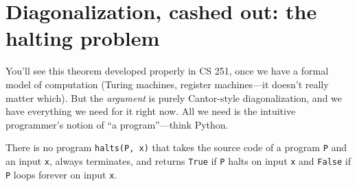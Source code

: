 \documentclass[11pt]{article}
\begin{document}
\section{Diagonalization, cashed out: the halting problem}

You'll see this theorem developed properly in CS 251, once we have a formal model of computation (Turing machines, register machines---it doesn't really matter which). But the \emph{argument} is purely Cantor-style diagonalization, and we have everything we need for it right now. All we need is the intuitive programmer's notion of ``a program''---think Python.

\begin{theorem}[Turing, 1936]
There is no program \texttt{halts(P, x)} that takes the source code of a program \texttt{P} and an input \texttt{x}, always terminates, and returns \texttt{True} if \texttt{P} halts on input \texttt{x} and \texttt{False} if \texttt{P} loops forever on input \texttt{x}.
\end{theorem}
\end{document}
